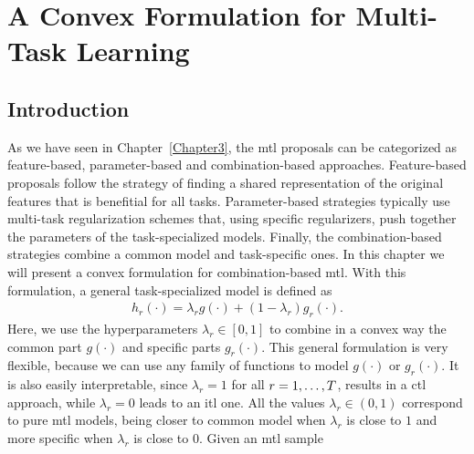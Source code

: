 
\chapter{A Convex Formulation for Multi-Task Learning} %
\label{Chapter4}

{\bf \small{

}}

\section{Introduction}
As we have seen in Chapter~\ref{Chapter3}, the \acrfull{mtl} proposals can be categorized as feature-based, parameter-based and combination-based approaches. Feature-based proposals follow the strategy of finding a shared representation of the original features that is benefitial for all tasks. Parameter-based strategies typically use multi-task regularization schemes that, using specific regularizers, push together the parameters of the task-specialized models.
Finally, the combination-based strategies combine a common model and task-specific ones. 
%
In this chapter we will present a convex formulation for combination-based \acrshort{mtl}. With this formulation, a general task-specialized model is defined as
\begin{equation}
    \label{eq:convexmtl_general}
    \begin{aligned}
        h_r(\cdot)
       = \lambda_r g(\cdot) + (1 - \lambda_r) g_r(\cdot) .
    \end{aligned}    
\end{equation}
Here, we use the hyperparameters $\lambda_r \in [0, 1]$ to combine in a convex way the common part $g(\cdot)$ and specific parts $g_r(\cdot)$. This general formulation is very flexible, because we can use any family of functions to model $g(\cdot)$ or $g_r(\cdot)$. It is also easily interpretable, since $\lambda_r=1$ for all $r=1, \ldots, T$, results in a \acrfull{ctl} approach, while $\lambda_r=0$ leads to an \acrfull{itl} one. All the values $\lambda_r \in (0, 1)$ correspond to pure \acrshort{mtl} models, being closer to common model when $\lambda_r$ is close to $1$ and more specific when $\lambda_r$ is close to $0$.
%
Given an \acrshort{mtl} sample 
